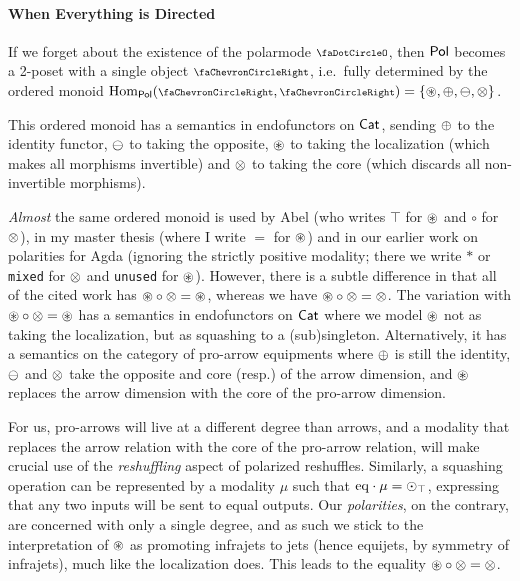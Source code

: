 \documentclass[a4paper]{memoir}
\begin{document}
\paragraph{When Everything is Directed}
If we forget about the existence of the polarmode $\npolar$, then ${\mathsf{Pol}}$ becomes a 2-poset with a single object $\ypolar$, i.e.\ fully determined by the ordered monoid $\Hom_\polcat(\ypolar, \ypolar) = \accol{\isopol, \pospol, \negpol, \mixpol}$.

This ordered monoid has a semantics in endofunctors on ${\mathsf{Cat}}$, sending ${\oplus}$ to the identity functor, ${\ominus}$ to taking the opposite, ${\oast}$ to taking the localization (which makes all morphisms invertible) and ${\otimes}$ to taking the core (which discards all non-invertible morphisms).

\emph{Almost} the same ordered monoid is used by Abel \cite{abel-polarized} (who writes $\top$ for ${\oast}$ and $\circ$ for ${\otimes}$),
in my master thesis \cite{nuyts-phd} (where I write $=$ for ${\oast}$)
and in our earlier work on polarities for Agda \cite{abstract-agda-polarities} (ignoring the strictly positive modality; there we write $*$ or \texttt{mixed} for ${\otimes}$ and \texttt{unused} for ${\oast}$).
However, there is a subtle difference in that all of the cited work has ${\oast} \circ {\otimes} = {\oast}$, whereas we have ${\oast} \circ {\otimes} = {\otimes}$.
The variation with ${\oast} \circ {\otimes} = {\oast}$ has a semantics in endofunctors on ${\mathsf{Cat}}$ where we model ${\oast}$ not as taking the localization, but as squashing to a (sub)singleton.
Alternatively, it has a semantics on the category of pro-arrow equipments \cite{nlab:proarrow,proarrow1,proarrow2} where ${\oplus}$ is still the identity, ${\ominus}$ and ${\otimes}$ take the opposite and core (resp.) of the arrow dimension, and ${\oast}$ replaces the arrow dimension with the core of the pro-arrow dimension.

For us, pro-arrows will live at a different degree than arrows, and a modality that replaces the arrow relation with the core of the pro-arrow relation, will make crucial use of the \emph{reshuffling} aspect of polarized reshuffles.
Similarly, a squashing operation can be represented by a modality $\mu$ such that ${\mathrm{eq}} \cdot \mu = {\odot}_\top$, expressing that any two inputs will be sent to equal outputs.
Our \emph{polarities}, on the contrary, are concerned with only a single degree, and as such we stick to the interpretation of ${\oast}$ as promoting infrajets to jets (hence equijets, by symmetry of infrajets), much like the localization does.
This leads to the equality ${\oast} \circ {\otimes} = {\otimes}$.
\end{document}
